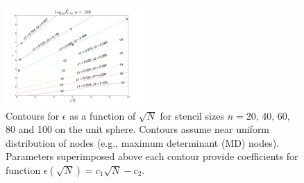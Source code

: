 \documentclass[11pt]{report}
\begin{document}
{\begin{figure}[htbp]
\includegraphics[width=0.475\textwidth]{../figures/chapter2/epsilon_contours/labeled_contour_n100.pdf}
\caption{Contours for $\epsilon$ as a function of $\sqrt{N}$ for stencil sizes $n=20$, 40, 60, 80 and 100 on the unit sphere. Contours assume near uniform distribution of nodes (e.g., maximum determinant (MD) nodes). Parameters superimposed above each contour provide coefficients for function $\epsilon(\sqrt{N}) = c_{1} \sqrt{N} - c_{2}$. }
\label{fig:epsilon_contours}
\end{figure}



}

%
%

\ifstandalone


\end{document}
